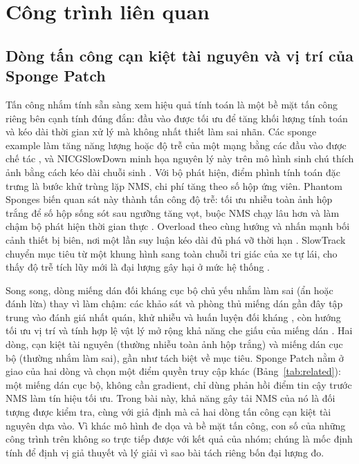 \documentclass[a4paper,fleqn]{cas-dc}
\begin{document}
\section{Công trình liên quan}
\label{sec:related}
\subsection{Dòng tấn công cạn kiệt tài nguyên và vị trí của Sponge Patch}
Tấn công nhắm tính sẵn sàng xem hiệu quả tính toán là một bề mặt tấn công riêng bên cạnh tính đúng đắn: đầu vào được tối ưu để tăng khối lượng tính toán và kéo dài thời gian xử lý mà không nhất thiết làm sai nhãn. Các sponge example làm tăng năng lượng hoặc độ trễ của một mạng bằng các đầu vào được chế tác \cite{shumailov2021sponge}, và NICGSlowDown minh họa nguyên lý này trên mô hình sinh chú thích ảnh bằng cách kéo dài chuỗi sinh \cite{nicgslowdown2022}. Với bộ phát hiện, điểm phình tính toán đặc trưng là bước khử trùng lặp NMS, chi phí tăng theo số hộp ứng viên. Phantom Sponges biến quan sát này thành tấn công độ trễ: tối ưu nhiễu toàn ảnh hộp trắng để số hộp sống sót sau ngưỡng tăng vọt, buộc NMS chạy lâu hơn và làm chậm bộ phát hiện thời gian thực \cite{phantom2023}. Overload theo cùng hướng và nhấn mạnh bối cảnh thiết bị biên, nơi một lần suy luận kéo dài đủ phá vỡ thời hạn \cite{overload2024}. SlowTrack chuyển mục tiêu từ một khung hình sang toàn chuỗi tri giác của xe tự lái, cho thấy độ trễ tích lũy mới là đại lượng gây hại ở mức hệ thống \cite{slowtrack2024}.

Song song, dòng miếng dán đối kháng cục bộ chủ yếu nhắm làm sai (ẩn hoặc đánh lừa) thay vì làm chậm: các khảo sát và phòng thủ miếng dán gần đây tập trung vào đánh giá nhất quán, khử nhiễu và huấn luyện đối kháng \cite{apde2025,pbcat2025}, còn hướng tối ưu vị trí và tính hợp lệ vật lý mở rộng khả năng che giấu của miếng dán \cite{iap2025}. Hai dòng, cạn kiệt tài nguyên (thường nhiễu toàn ảnh hộp trắng) và miếng dán cục bộ (thường nhắm làm sai), gần như tách biệt về mục tiêu. Sponge Patch nằm ở giao của hai dòng và chọn một điểm quyền truy cập khác (Bảng~\ref{tab:related}): một miếng dán cục bộ, không cần gradient, chỉ dùng phản hồi điểm tin cậy trước NMS làm tín hiệu tối ưu. Trong bài này, khả năng gây tải NMS của nó là đối tượng được kiểm tra, cùng với giả định mà cả hai dòng tấn công cạn kiệt tài nguyên dựa vào. Vì khác mô hình đe dọa và bề mặt tấn công, con số của những công trình trên không so trực tiếp được với kết quả của nhóm; chúng là mốc định tính để định vị giả thuyết và lý giải vì sao bài tách riêng bốn đại lượng đo.
\end{document}
